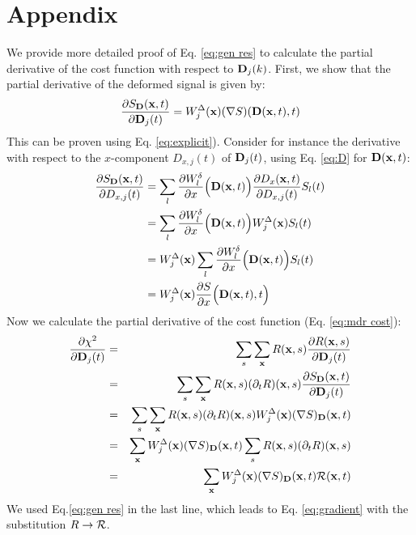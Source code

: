 \documentclass[num-refs]{wiley-article}
\newcommand{\x}{{\bf x}}
\newcommand{\D}{{\bf D}}
\begin{document}
\section{Appendix}
We provide more detailed proof of Eq. \ref{eq:gen res} to calculate the partial derivative of the cost function with respect to $\D_j(k)$. First, we show that the partial derivative of the deformed signal is given by: 
\begin{equation}
\label{eq:grad}
\frac {\partial S_\D(\x, t)}{\partial \D_j(t) }=W^{\Delta}_j(\x) (\nabla S)(\D (\x,t), t)
\end{equation}
This can be proven using Eq. \ref{eq:explicit}). Consider for instance the derivative with respect to the $x$-component $D_{x,j}(t)$ of $\D_j(t)$, using Eq. \ref{eq:D} for $\D(\x, t)$:
\begin{equation*}
\begin{split}
\frac{\partial S_{\bf D}(\x, t)}{\partial D_{x,j}(t)} 
& =\sum_l  \frac{\partial W_l^{\delta}}{\partial x}\Big( \D (\x, t)\Big)  \frac{\partial D_x(\x, t)}{\partial D_{x,j}(t)} S_l(t) \\
&= \sum_l \frac{\partial W_l^{\delta}}{\partial x}\Big( \D (\x, t)\Big) W_j^{\Delta}(\x) S_l(t)\\
& =  W_j^{\Delta}(\x) \sum_l  \frac{\partial W_l^{\delta}}{\partial x}\Big( \D (\x, t)\Big) S_l(t)\\
& =  W_j^{\Delta}(\x) \frac{\partial S}{\partial x}\Big(\D (\x, t),t\Big)
\end{split}
\end{equation*}
Now we calculate the partial derivative of the cost function (Eq. \ref{eq:mdr cost}): 
\begin{eqnarray*} 
	\frac{\partial \chi^2}{\partial \D_j(t)} 
	&=& \sum_s\sum_\x R(\x, s)\frac{\partial R(\x,s)}{\partial \D_j(t)}  \\
	&=& \sum_s\sum_\x R(\x, s) (\partial_t R)(\x,s) \frac{\partial S_{\bf D}(\x, t)}{\partial \D_j(t)} \\
	&=& \sum_s\sum_\x R(\x, s) (\partial_t R)(\x,s) W_j^{\Delta}(\x) (\nabla S)_\D(\x,t) \\
	&=& \sum_\x W_j^{\Delta}(\x) (\nabla S)_\D(\x,t) \sum_s R(\x, s) (\partial_t R)(\x, s)  \\
	&=& \sum_\x W_j^{\Delta}(\x) (\nabla S)_\D(\x,t) {\cal R}(\x, t) \\
\end{eqnarray*}
We used Eq.\ref{eq:gen res} in the last line, which leads to Eq. \ref{eq:gradient} with the substitution $R\to {\cal R}$.
\end{document}
